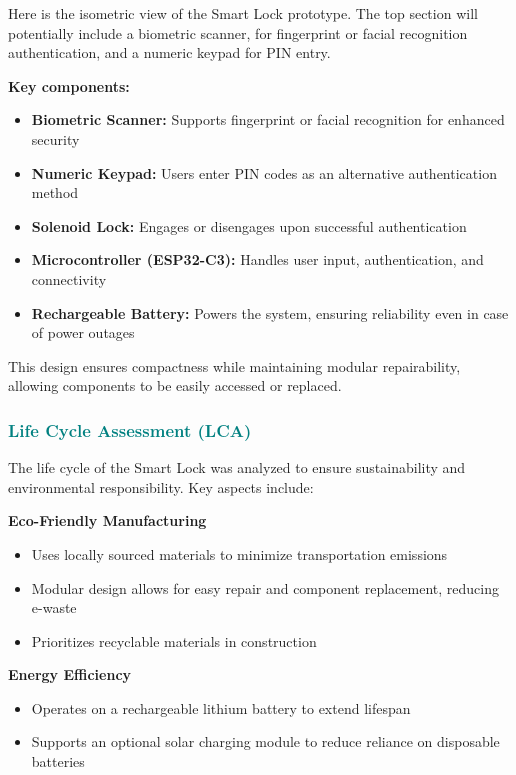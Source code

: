 Here is the isometric view of the Smart Lock prototype. The top section will potentially include a biometric scanner, for fingerprint or facial recognition authentication, and a numeric keypad for PIN entry.\newline

\textbf{Key components:}
\begin{itemize}
    \item \textbf{Biometric Scanner:} Supports fingerprint or facial recognition for enhanced security
    \item \textbf{Numeric Keypad:} Users enter PIN codes as an alternative authentication method
    \item \textbf{Solenoid Lock:} Engages or disengages upon successful authentication
    \item \textbf{Microcontroller (ESP32-C3):} Handles user input, authentication, and connectivity
    \item \textbf{Rechargeable Battery:} Powers the system, ensuring reliability even in case of power outages
\end{itemize}

This design ensures compactness while maintaining modular repairability, allowing components to be easily accessed or replaced.


\subsubsection{\textcolor{teal}{Life Cycle Assessment (LCA)}}

The life cycle of the Smart Lock was analyzed to ensure sustainability and environmental responsibility. Key aspects include: \newline

\textbf{Eco-Friendly Manufacturing}
\begin{itemize}
    \item Uses locally sourced materials to minimize transportation emissions
    \item Modular design allows for easy repair and component replacement, reducing e-waste
    \item Prioritizes recyclable materials in construction
\end{itemize}

\textbf{Energy Efficiency}
\begin{itemize}
    \item Operates on a rechargeable lithium battery to extend lifespan
    \item Supports an optional solar charging module to reduce reliance on disposable batteries
\end{itemize}

